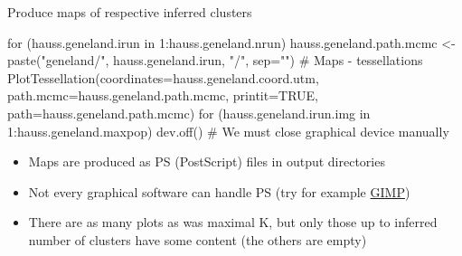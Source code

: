 \documentclass[compress, xelatex, 11pt, xcolor=svgnames, aspectratio=169, url={hyphens, lowtilde}]{beamer}
\begin{document}

\begin{frame}[fragile]{Produce maps of respective inferred clusters}
	\begin{spluscode}
    for (hauss.geneland.irun in 1:hauss.geneland.nrun) {
      hauss.geneland.path.mcmc <- paste("geneland/",
        hauss.geneland.irun, "/", sep="")
      # Maps - tessellations
      PlotTessellation(coordinates=hauss.geneland.coord.utm,
        path.mcmc=hauss.geneland.path.mcmc, printit=TRUE,
        path=hauss.geneland.path.mcmc)
      for (hauss.geneland.irun.img in 1:hauss.geneland.maxpop) {
        dev.off() } # We must close graphical device manually
      }
	\end{spluscode}
	\begin{itemize}
		\item Maps are produced as PS (PostScript) files in output directories
		\item Not every graphical software can handle PS (try for example \href{https://www.gimp.org/}{GIMP})
		\item There are as many plots as was maximal K, but only those up to inferred number of clusters have some content (the others are empty)
	\end{itemize}
\end{frame}
\end{document}
